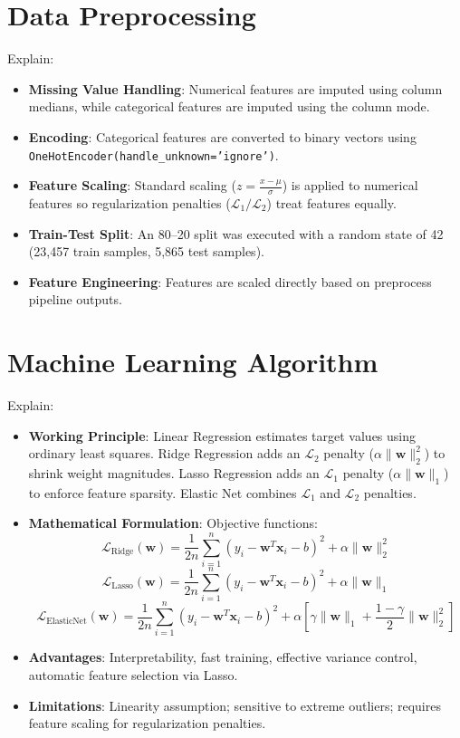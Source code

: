 \documentclass[12pt,a4paper]{article}
\begin{document}
\section{Data Preprocessing}
Explain:
\begin{itemize}
\item \textbf{Missing Value Handling}: Numerical features are imputed using column medians, while categorical features are imputed using the column mode.
\item \textbf{Encoding}: Categorical features are converted to binary vectors using \texttt{OneHotEncoder(handle\_unknown='ignore')}.
\item \textbf{Feature Scaling}: Standard scaling ($z = \frac{x - \mu}{\sigma}$) is applied to numerical features so regularization penalties ($\mathcal{L}_1/\mathcal{L}_2$) treat features equally.
\item \textbf{Train-Test Split}: An 80--20 split was executed with a random state of 42 (23,457 train samples, 5,865 test samples).
\item \textbf{Feature Engineering}: Features are scaled directly based on preprocess pipeline outputs.
\end{itemize}

\section{Machine Learning Algorithm}
Explain:
\begin{itemize}
\item \textbf{Working Principle}:
Linear Regression estimates target values using ordinary least squares. Ridge Regression adds an $\mathcal{L}_2$ penalty ($\alpha \|\mathbf{w}\|_2^2$) to shrink weight magnitudes. Lasso Regression adds an $\mathcal{L}_1$ penalty ($\alpha \|\mathbf{w}\|_1$) to enforce feature sparsity. Elastic Net combines $\mathcal{L}_1$ and $\mathcal{L}_2$ penalties.
\item \textbf{Mathematical Formulation}:
Objective functions:
$$\mathcal{L}_{\text{Ridge}}(\mathbf{w}) = \frac{1}{2n} \sum_{i=1}^n (y_i - \mathbf{w}^T \mathbf{x}_i - b)^2 + \alpha \|\mathbf{w}\|_2^2$$
$$\mathcal{L}_{\text{Lasso}}(\mathbf{w}) = \frac{1}{2n} \sum_{i=1}^n (y_i - \mathbf{w}^T \mathbf{x}_i - b)^2 + \alpha \|\mathbf{w}\|_1$$
$$\mathcal{L}_{\text{ElasticNet}}(\mathbf{w}) = \frac{1}{2n} \sum_{i=1}^n (y_i - \mathbf{w}^T \mathbf{x}_i - b)^2 + \alpha \left[ \gamma \|\mathbf{w}\|_1 + \frac{1-\gamma}{2} \|\mathbf{w}\|_2^2 \right]$$
\item \textbf{Advantages}:
Interpretability, fast training, effective variance control, automatic feature selection via Lasso.
\item \textbf{Limitations}:
Linearity assumption; sensitive to extreme outliers; requires feature scaling for regularization penalties.
\end{itemize}
\end{document}
